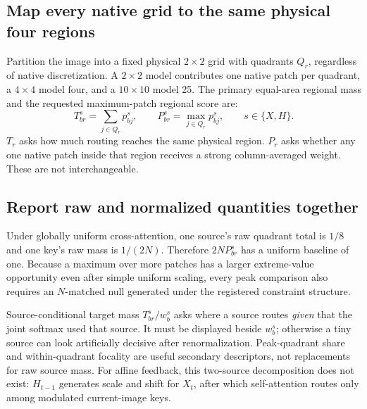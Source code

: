 \documentclass[11pt]{article}
\begin{document}
\subsection{Map every native grid to the same physical four regions}
Partition the image into a fixed physical $2\times2$ grid with quadrants $Q_r$, regardless of native discretization. A $2\times2$ model contributes one native patch per quadrant, a $4\times4$ model four, and a $10\times10$ model 25. The primary equal-area regional mass and the requested maximum-patch regional score are:
\begin{equation}
T^s_{br}=\sum_{j\in Q_r}p^s_{bj},
\qquad
P^s_{br}=\max_{j\in Q_r}p^s_{bj},
\qquad s\in\{X,H\}.
\end{equation}
$T_r$ asks how much routing reaches the same physical region. $P_r$ asks whether any one native patch inside that region receives a strong column-averaged weight. These are not interchangeable.

\subsection{Report raw and normalized quantities together}
Under globally uniform cross-attention, one source's raw quadrant total is $1/8$ and one key's raw mass is $1/(2N)$. Therefore $2NP^s_{br}$ has a uniform baseline of one. Because a maximum over more patches has a larger extreme-value opportunity even after simple uniform scaling, every peak comparison also requires an $N$-matched null generated under the registered constraint structure.

Source-conditional target mass $T^s_{br}/w^s_b$ asks where a source routes \emph{given} that the joint softmax used that source. It must be displayed beside $w^s_b$; otherwise a tiny source can look artificially decisive after renormalization. Peak-quadrant share and within-quadrant focality are useful secondary descriptors, not replacements for raw source mass. For affine feedback, this two-source decomposition does not exist: $H_{t-1}$ generates scale and shift for $X_t$, after which self-attention routes only among modulated current-image keys.
\end{document}
